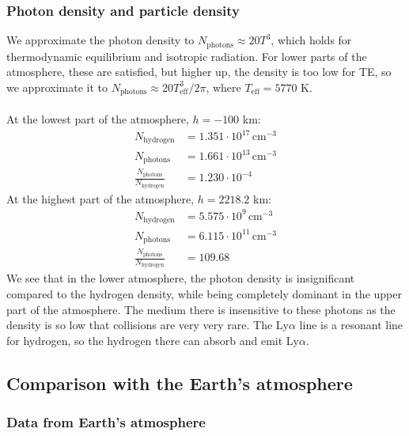 \documentclass{article}
\begin{document}
\subsubsection{Photon density and particle density}
We approximate the photon density to $N_{\text{photons}} \approx 20T^3$, which holds for thermodynamic equilibrium and isotropic radiation. For lower parts of the atmosphere, these are satisfied, but higher up, the density is too low for TE, so we approximate it to $N_{\text{photons}} \approx 20T_{\text{eff}}^3/2\pi$, where $T_{\text{eff}} = 5770$ K.\\\\
At the lowest part of the atmosphere, $h = -100$ km:
\begin{align*}
  N_{\text{hydrogen}} &= 1.351\cdot10^{17} \,\text{cm}^{-3}\\
  N_{\text{photons}} &= 1.661\cdot10^{13}\,\text{cm}^{-3}\\
  \frac{N_{\text{photons}}}{N_{\text{hydrogen}}} &= 1.230\cdot10^{-4}
\end{align*}
At the highest part of the atmosphere, $h = 2218.2$ km:
\begin{align*}
  N_{\text{hydrogen}} &= 5.575\cdot10^{9} \,\text{cm}^{-3}\\
  N_{\text{photons}} &= 6.115\cdot10^{11}\,\text{cm}^{-3}\\
  \frac{N_{\text{photons}}}{N_{\text{hydrogen}}} &= 109.68
\end{align*}
We see that in the lower atmosphere, the photon density is insignificant compared to the hydrogen density, while being completely dominant in the upper part of the atmosphere. The medium there is insensitive to these photons as the density is so low that collisions are very very rare. The Ly$\alpha$ line is a resonant line for hydrogen, so the hydrogen there can absorb and emit Ly$\alpha$.

\subsection{Comparison with the Earth's atmosphere}
\subsubsection{Data from Earth's atmosphere}
\end{document}
